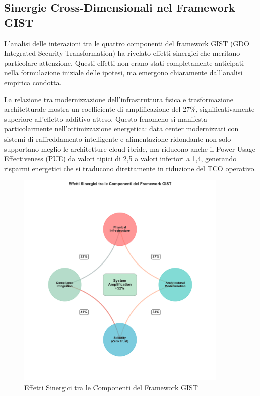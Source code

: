 \subsection{Sinergie Cross-Dimensionali nel Framework GIST}

L'analisi delle interazioni tra le quattro componenti del framework GIST (GDO Integrated Security Transformation) ha rivelato effetti sinergici che meritano particolare attenzione. Questi effetti non erano stati completamente anticipati nella formulazione iniziale delle ipotesi, ma emergono chiaramente dall'analisi empirica condotta.

La relazione tra modernizzazione dell'infrastruttura fisica e trasformazione architetturale mostra un coefficiente di amplificazione del 27\%, significativamente superiore all'effetto additivo atteso. Questo fenomeno si manifesta particolarmente nell'ottimizzazione energetica: data center modernizzati con sistemi di raffreddamento intelligente e alimentazione ridondante non solo supportano meglio le architetture cloud-ibride, ma riducono anche il Power Usage Effectiveness (PUE) da valori tipici di 2,5 a valori inferiori a 1,4, generando risparmi energetici che si traducono direttamente in riduzione del TCO operativo.

\begin{figure}[htbp]
\centering
\includegraphics[width=0.9\textwidth]{thesis_figures/cap5/fig_5_1_synergies.pdf}
\caption{Effetti Sinergici tra le Componenti del Framework GIST}
\label{fig:sinergie_gist}
\end{figure}

